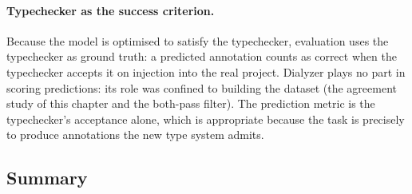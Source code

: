 \paragraph{Typechecker as the success criterion.}
Because the model is optimised to satisfy the typechecker, evaluation uses the typechecker as ground truth: a predicted annotation counts as correct when the typechecker accepts it on injection into the real project.
Dialyzer plays no part in scoring predictions: its role was confined to building the dataset (the agreement study of this chapter and the both-pass filter). The prediction metric is the typechecker's acceptance alone, which is appropriate because the task is precisely to produce annotations the new type system admits.

\subsection{Summary}

